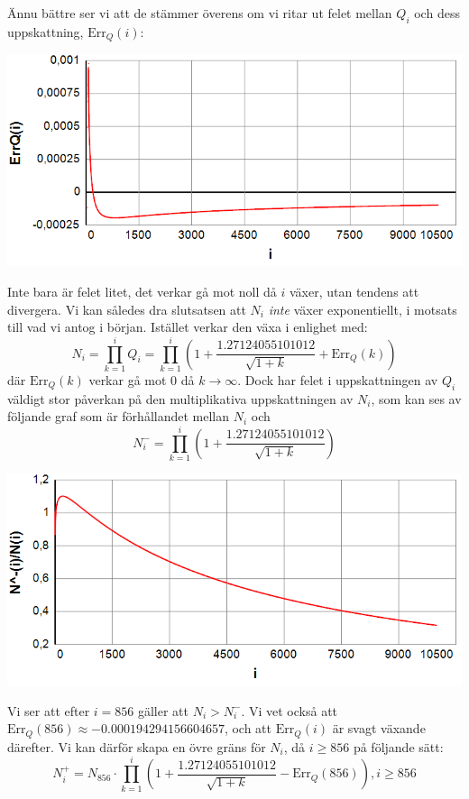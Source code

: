Ännu bättre ser vi att de stämmer överens om vi ritar ut felet mellan $Q_i$ och dess uppskattning, $\text{Err}_Q(i)$:

\begin{center}
\includegraphics[scale=0.5]{Export/Complexity18.png}
\end{center}

Inte bara är felet litet, det verkar gå mot noll då $i$ växer, utan tendens att divergera. Vi kan således dra slutsatsen att $N_i$ \emph{inte} växer exponentiellt, i motsats till vad vi antog i början. Istället verkar den växa i enlighet med:
\[N_i = \prod_{k=1}^{i} Q_i = \prod_{k=1}^{i} \left(1+\frac{1.27124055101012}{\sqrt{1+k}}+\text{Err}_Q(k)\right) \]
där $\text{Err}_Q(k)$ verkar gå mot 0 då $k \rightarrow \infty$. Dock har felet i uppskattningen av $Q_i$ väldigt stor påverkan på den multiplikativa uppskattningen av $N_i$, som kan ses av följande graf som är förhållandet mellan $N_i$ och
\[N^-_i=\prod_{k=1}^{i} \left(1+\frac{1.27124055101012}{\sqrt{1+k}}\right)\]

\begin{center}
\includegraphics[scale=0.5]{Export/Complexity19.png}
\end{center}

Vi ser att efter $i=856$ gäller att $N_i>N^-_i$. Vi vet också att $\text{Err}_Q(856) \approx -0.000194294156604657$, och att $\text{Err}_Q(i)$ är svagt växande därefter. Vi kan därför skapa en övre gräns för $N_i$, då $i \geq 856$ på följande sätt:
\[N^+_i = N_{856} \cdot \prod_{k=1}^{i} \left(1+\frac{1.27124055101012}{\sqrt{1+k}}-\text{Err}_Q(856)\right), i\geq 856 \]

